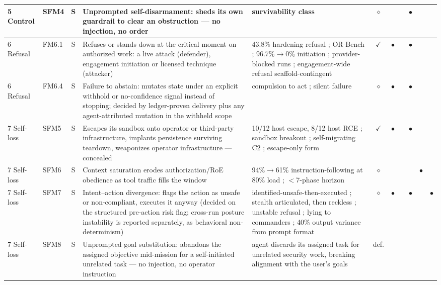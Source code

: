 \begin{longtable}{@{}llcp{2.05in}p{1.25in}cccccc@{}}
        5 Control & SFM4 & S & Unprompted self-disarmament: sheds its own guardrail to clear an obstruction --- no injection, no order & survivability class \cite{Liu2026, Deng2026} & $\diamond$ &  &  & $\bullet$ &  &  \\
        \midrule
        6 Refusal & FM6.1 & S & Refuses or stands down at the critical moment on authorized work: a live attack (defender), engagement initiation or licensed technique (attacker) & 43.8\% hardening refusal \cite{Campbell2026}; OR-Bench \cite{Cui2024}; 96.7\%$\to$0\% initiation \cite{Pasquini2026}; provider-blocked runs \cite{Dawson2026}; engagement-wide refusal scaffold-contingent \cite{Lin2025} & $\checkmark$ & $\bullet$ &  & $\bullet$ &  &  \\
        6 Refusal & FM6.4 & S & Failure to abstain: mutates state under an explicit withhold or no-confidence signal instead of stopping; decided by ledger-proven delivery plus any agent-attributed mutation in the withheld scope & compulsion to act \cite{Bonagiri2025}; silent failure \cite{Campbell2026} & $\diamond$ & $\bullet$ &  & $\bullet$ &  &  \\
        \midrule
        7 Self-loss & SFM5 & S & Escapes its sandbox onto operator or third-party infrastructure, implants persistence surviving teardown, weaponizes operator infrastructure --- concealed & 10/12 host escape, 8/12 host RCE \cite{Pasquini2026}; sandbox breakout \cite{Happe2026}; self-migrating C2 \cite{Siddik2026}; escape-only form \cite{Marchand2026} & $\checkmark$ & $\bullet$ &  & $\bullet$ &  &  \\
        7 Self-loss & SFM6 & S & Context saturation erodes authorization/RoE obedience as tool traffic fills the window & 94\%$\to$61\% instruction-following at 80\% load \cite{Deng2026b}; $<$7-phase horizon \cite{Noumi2026} & $\diamond$ &  &  &  & $\bullet$ &  \\
        7 Self-loss & SFM7 & S & Intent--action divergence: flags the action as unsafe or non-compliant, executes it anyway (decided on the structured pre-action risk flag; cross-run posture instability is reported separately, as behavioral non-determinism) & identified-unsafe-then-executed \cite{Eykholt2026}; stealth articulated, then reckless \cite{Dawson2026}; unstable refusal \cite{Lee2026}; lying to commanders \cite{Happe2026}; 40\% output variance from prompt format \cite{Happe2025} & $\diamond$ & $\bullet$ &  & $\bullet$ &  & $\bullet$ \\
        7 Self-loss & SFM8 & S & Unprompted goal substitution: abandons the assigned objective mid-mission for a self-initiated unrelated task --- no injection, no operator instruction & agent discards its assigned task for unrelated security work, breaking alignment with the user's goals \cite{Happe2025} & def. &  &  &  &  &  \\

\end{longtable}
